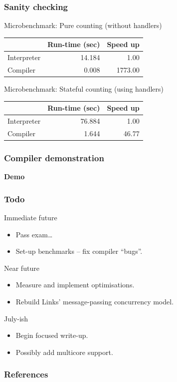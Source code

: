\documentclass[10pt,compress]{beamer}
\begin{document}
\begin{frame}
  \frametitle{Sanity checking}
  Microbenchmark: Pure counting (without handlers)
  \begin{table}
    \begin{tabular}{| l | r | r|}
      \hline
                  & Run-time (sec) & Speed up \\
      \hline
      Interpreter & 14.184         & 1.00 \\
      \hline
      Compiler    & 0.008          & 1773.00 \\
      \hline
    \end{tabular}
  \end{table}

  Microbenchmark: Stateful counting (using handlers)
  \begin{table}
    \begin{tabular}{| l | r | r|}
      \hline
                  & Run-time (sec) & Speed up \\
      \hline
      Interpreter & 76.884         & 1.00 \\
      \hline
      Compiler    & 1.644          & 46.77 \\
      \hline
    \end{tabular}
  \end{table}

\end{frame}

\begin{frame}
  \frametitle{Compiler demonstration}
  \begin{center}
    {\Huge\textbf{Demo}}
  \end{center}
\end{frame}

\begin{frame}
  \frametitle{Todo}
  Immediate future
  \begin{itemize}
    \item Pass exam\dots
    \item Set-up benchmarks -- fix compiler ``bugs''.
  \end{itemize}
  Near future
  \begin{itemize}
    \item Measure and implement optimisations.   
    \item Rebuild Links' message-passing concurrency model.
  \end{itemize}
  July-ish
  \begin{itemize}
    \item Begin focused write-up.
    \item Possibly add multicore support.
  \end{itemize}
\end{frame}

\begin{frame}
  \frametitle{References}
  
  
\end{frame}
\end{document}
